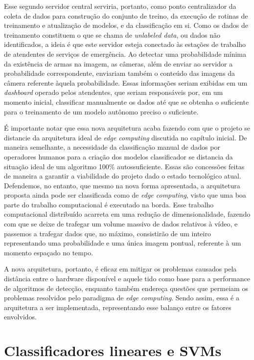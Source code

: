 \documentclass[]{politex}
\begin{document}
Esse segundo servidor central serviria, portanto, como ponto centralizador da coleta de dados para construção do conjunto de treino, da execução de rotinas de treinamento e atualização de modelos, e da classificação em si. Como os dados de treinamento constituem o que se chama de \textit{unlabeled data}, ou dados não identificados, a ideia é que este servidor esteja conectado às estações de trabalho de atendentes de serviços de emergência. Ao detectar uma probabilidade mínima da existência de armas na imagem, as câmeras, além de enviar ao servidor a probabilidade correspondente, enviariam também o conteúdo das imagens da câmera referente àquela probabilidade. Essas informações seriam exibidas em um \textit{dashboard} operado pelos atendentes, que seriam responsáveis por, em um momento inicial, classificar manualmente os dados até que se obtenha o suficiente para o treinamento de um modelo autônomo preciso o suficiente.

É importante notar que essa nova arquitetura acaba fazendo com que o projeto se distancie da arquitetura ideal de \textit{edge computing} discutida no capítulo inicial. De maneira semelhante, a necessidade da classificação manual de dados por operadores humanos para a criação dos modelos classificador se distancia da situação ideal de um algoritmo 100\% autossuficiente. Essas são concessões feitas de maneira a garantir a viabilidade do projeto dado o estado tecnológico atual. Defendemos, no entanto, que mesmo na nova forma apresentada, a arquitetura proposta ainda pode ser classificada como de \textit{edge computing}, visto que uma boa parte do trabalho computacional é executado na borda. Esse trabalho computacional distribuído acarreta em uma redução de dimensionalidade, fazendo com que se deixe de trafegar um volume massivo de dados relativos à vídeo, e passemos a trafegar dados que, no máximo, consistirão de um inteiro representando uma probabilidade e uma única imagem pontual, referente à um momento espaçado no tempo.

A nova arquitetura, portanto, é eficaz em mitigar os problemas causados pela distância entre o hardware disponível e aquele tido como base para a performance de algoritmos de detecção, enquanto também endereça questões que permeiam os problemas resolvidos pelo paradigma de \textit{edge computing}. Sendo assim, essa é a arquitetura a ser implementada, representando esse balanço entre os fatores envolvidos.

\section{Classificadores lineares e SVMs}
\end{document}
